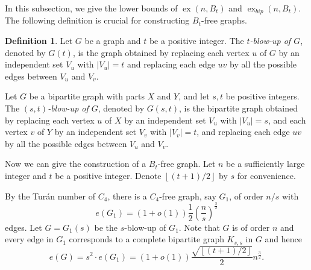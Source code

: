 \documentclass[11pt,a4paper]{article}
\newtheorem{theorem}{Theorem}[section]
\theoremstyle{definition}
\newtheorem{definition}[theorem]{Definition}
\newcommand{\floor}[1]{\left\lfloor #1 \right\rfloor}
\DeclareMathOperator{\ex}{ex}
\begin{document}

        In this subsection, we give the lower bounds of $\ex(n, B_t)$ and $\ex_{bip}(n, B_t)$.
        The following definition is crucial for constructing $B_t$-free graphs.

        \begin{definition}\label{def:blow up}
            Let $G$ be a graph and $t$ be a positive integer.
            The {\it $t$-blow-up of $G$}, denoted by $G(t)$, is the graph obtained by replacing each vertex $u$ of $G$ by an independent set $V_u$ with $|V_u|=t$ and replacing each edge $uv$ by all the possible edges between $V_u$ and $V_v$.

            Let $G$ be a bipartite graph with parts $X$ and $Y$, and let $s, t$ be positive integers.
            The {\it $(s, t)$-blow-up of $G$}, denoted by $G(s, t)$, is the bipartite graph obtained by replacing each vertex $u$ of $X$ by an independent set $V_u$ with $|V_u|=s$, and each vertex $v$ of $Y$ by an independent set $V_v$ with $|V_v|=t$, and replacing each edge $uv$ by all the possible edges between $V_u$ and $V_v$.
        \end{definition}

        Now we can give the construction of a $B_t$-free graph.
        Let $n$ be a sufficiently large integer and $t$ be a positive integer.
        Denote $\floor{(t+1)/2}$ by $s$ for convenience.

        By the Tur\'{a}n number of $C_4$, there is a $C_4$-free graph, say $G_1$, of order $n/s$ with
        \begin{equation*}
            e(G_1) = (1 + o(1)) \frac{1}{2} \left(\frac{n}{s}\right)^{\frac{3}{2}}
        \end{equation*}
        edges.
        Let $G = G_1(s)$ be the $s$-blow-up of $G_1$.
        Note that $G$ is of order $n$ and every edge in $G_1$ corresponds to a complete bipartite graph $K_{s, s}$ in $G$ and hence
        \begin{equation*}
            e(G) = s^2 \cdot e(G_1) = (1 + o(1))\frac{\sqrt{\floor{(t+1)/2}}}{2} n^{\frac{3}{2}}.
        \end{equation*}
\end{document}
